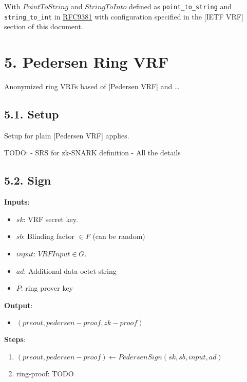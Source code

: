 \documentclass[
]{article}
\providecommand{\tightlist}{%
  \setlength{\itemsep}{0pt}\setlength{\parskip}{0pt}}
\begin{document}
With \(PointToString\) and \(StringToInto\) defined as
\texttt{point\_to\_string} and \texttt{string\_to\_int} in
\href{https://datatracker.ietf.org/doc/rfc9381/}{RFC9381} with
configuration specified in the {[}IETF VRF{]} section of this document.

\hypertarget{pedersen-ring-vrf}{%
\section{5. Pedersen Ring VRF}\label{pedersen-ring-vrf}}

Anonymized ring VRFs based of {[}Pedersen VRF{]} and \ldots{}

\hypertarget{setup-1}{%
\subsection{5.1. Setup}\label{setup-1}}

Setup for plain {[}Pedersen VRF{]} applies.

TODO: - SRS for zk-SNARK definition - All the details

\hypertarget{sign-2}{%
\subsection{5.2. Sign}\label{sign-2}}

\textbf{Inputs}:

\begin{itemize}
\tightlist
\item
  \(sk\): VRF secret key.
\item
  \(sb\): Blinding factor \(\in F\) (can be random)
\item
  \(input\): \(VRFInput \in G\).
\item
  \(ad\): Additional data octet-string
\item
  \(P\): ring prover key
\end{itemize}

\textbf{Output}:

\begin{itemize}
\tightlist
\item
  \((preout, pedersen-proof, zk-proof)\)
\end{itemize}

\textbf{Steps}:

\begin{enumerate}
\def\labelenumi{\arabic{enumi}.}
\tightlist
\item
  \((preout, pedersen-proof) \leftarrow PedersenSign(sk, sb, input, ad)\)
\item
  ring-proof: TODO
\end{enumerate}
\end{document}
